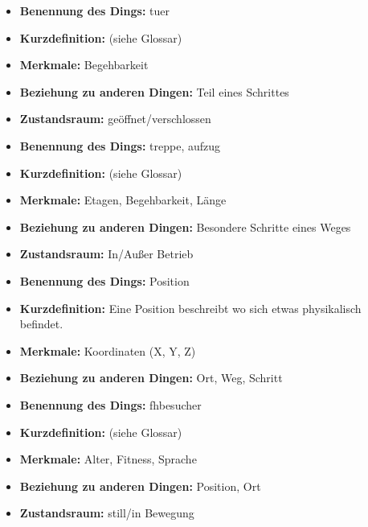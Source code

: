 \hrulefill

\begin{itemize}
\item \textbf{Benennung des Dings:} \Gls{tuer}
\item \textbf{Kurzdefinition:} (siehe Glossar)
\item \textbf{Merkmale:} Begehbarkeit
\item \textbf{Beziehung zu anderen Dingen:} Teil eines Schrittes
\item \textbf{Zustandsraum:} geöffnet/verschlossen
\end{itemize}

\hrulefill

\begin{itemize}
\item \textbf{Benennung des Dings:} \Gls{treppe}, \Gls{aufzug}
\item \textbf{Kurzdefinition:} (siehe Glossar)
\item \textbf{Merkmale:} Etagen, Begehbarkeit, Länge
\item \textbf{Beziehung zu anderen Dingen:} Besondere Schritte eines Weges
\item \textbf{Zustandsraum:} In/Außer Betrieb
\end{itemize}

\hrulefill

\begin{itemize}
\item \textbf{Benennung des Dings:} Position
\item \textbf{Kurzdefinition:} Eine Position beschreibt wo sich etwas physikalisch befindet.
\item \textbf{Merkmale:} Koordinaten (X, Y, Z)
\item \textbf{Beziehung zu anderen Dingen:} Ort, Weg, Schritt
\end{itemize}


\hrulefill

\begin{itemize}
\item \textbf{Benennung des Dings:} \Gls{fhbesucher}
\item \textbf{Kurzdefinition:} (siehe Glossar)
\item \textbf{Merkmale:} Alter, Fitness, Sprache
\item \textbf{Beziehung zu anderen Dingen:} Position, Ort
\item \textbf{Zustandsraum:} still/in Bewegung
\end{itemize}

